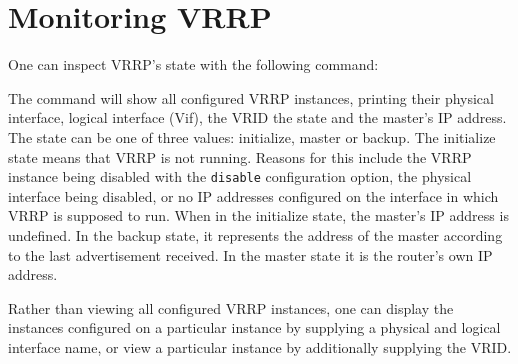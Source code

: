 \section{Monitoring VRRP}
One can inspect VRRP's state with the following command:

\vspace{0.1in}
\noindent{}
\vspace{0.1in}

The command will show all configured VRRP instances, printing their physical
interface, logical interface (Vif), the VRID the state and the master's IP
address.  The state can be one of three values: initialize, master or backup.
The initialize state means that VRRP is not running.  Reasons for this include
the VRRP instance being disabled with the {\tt disable} configuration option,
the physical interface being disabled, or no IP addresses configured on the
interface in which VRRP is supposed to run.  When in the initialize state, the
master's IP address is undefined.  In the backup state, it represents the
address of the master according to the last advertisement received.  In the
master state it is the router's own IP address.

Rather than viewing all configured VRRP instances, one can display the instances
configured on a particular instance by supplying a physical and logical interface
name, or view a particular instance by additionally supplying the VRID.

